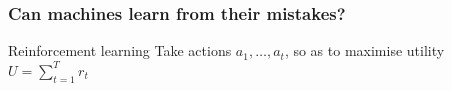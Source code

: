 \documentclass{beamer}
\begin{document}





\begin{frame}
  \frametitle{Can machines learn from their mistakes?}
  \begin{center}
  \end{center}
  \begin{block}{Reinforcement learning}
    Take actions $a_1, \ldots, a_t$, so as to maximise utility
    $U = \sum_{t=1}^T r_t$
  \end{block}
\end{frame}


\end{document}
